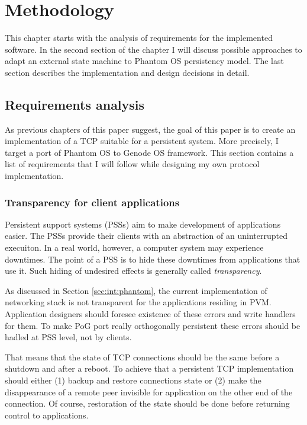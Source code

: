 \chapter{Methodology}
\label{chap:meth}

This chapter starts with the analysis of requirements for the implemented
software. In the second section of the chapter I will discuss possible
approaches to adapt an external state machine to Phantom OS persistency model.
The last section describes the implementation and design decisions in detail.

\section {Requirements analysis}

As previous chapters of this paper suggest, the goal of this paper is to create
an implementation of a TCP suitable for a persistent system. More precisely, I
target a port of Phantom OS to Genode OS framework. This section contains a
list of requirements that I will follow while designing my own protocol
implementation.

\subsection {Transparency for client applications}
Persistent support systems (PSSs) aim to make development of applications
easier. The PSSs provide their clients with an abstraction of an uninterrupted
execuiton. In a real world, however, a computer system may experience
downtimes. The point of a PSS is to hide these downtimes from applications that
use it. Such hiding of undesired effects is generally called
\textit{transparency}.

As discussed in Section \ref{sec:int:phantom}, the current implementation of
networking stack is not transparent for the applications residing in PVM.
Application designers should foresee existence of these errors and write
handlers for them. To make PoG port really orthogonally persistent these errors
should be hadled at PSS level, not by clients.

That means that the state of TCP connections should be the same before a
shutdown and after a reboot. To achieve that a persistent TCP implementation
should either (1) backup and restore connections state or (2) make the
disappearance of a remote peer invisible for application on the other end of
the connection. Of course, restoration of the state should be done before
returning control to applications.

